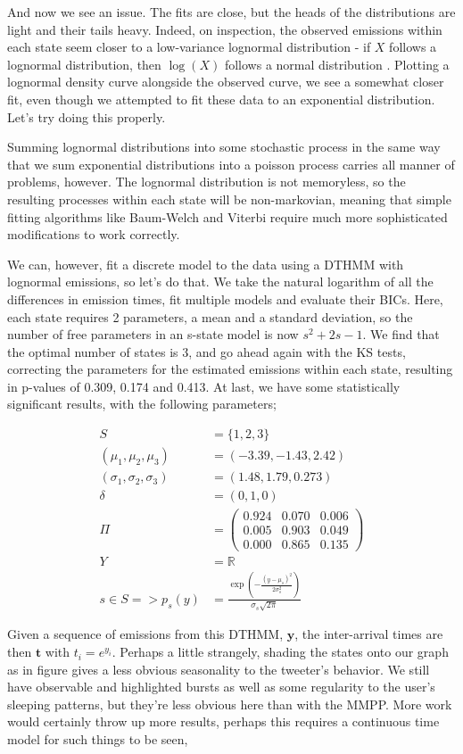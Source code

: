 
And now we see an issue. The fits are close, but the heads of the distributions are light and their tails heavy. Indeed, on inspection, the observed emissions within each state seem closer to a low-variance lognormal distribution - if $X$ follows a lognormal distribution, then $\log(X)$ follows a normal distribution %
. Plotting a lognormal density curve alongside the observed curve, we see a somewhat closer fit, even though we attempted to fit these data to an exponential distribution. Let's try doing this properly.

Summing lognormal distributions into some stochastic process in the same way that we sum exponential distributions into a poisson process carries all manner of problems, however. The lognormal distribution is not memoryless, so the resulting processes within each state will be non-markovian, meaning that simple fitting algorithms like Baum-Welch and Viterbi require much more sophisticated modifications to work correctly.

We can, however, fit a discrete model to the data using a DTHMM with lognormal emissions, so let's do that. We take the natural logarithm of all the differences in emission times, fit multiple models and evaluate their BICs. Here, each state requires 2 parameters, a mean and a standard deviation, so the number of free parameters in an s-state model is now $s^2+2s-1$. We find that the optimal number of states is 3, and go ahead again with the KS tests, correcting the parameters for the estimated emissions within each state, resulting in p-values of 0.309, 0.174 and 0.413. At last, we have some statistically significant results, with the following parameters;

\begin{align*}
S &= \{1,2,3\}\\
(\mu_1, \mu_2, \mu_3) &= (-3.39, -1.43, 2.42)\\
(\sigma_1, \sigma_2, \sigma_3) &= (1.48, 1.79, 0.273)\\
\delta &= (0,1,0)\\
\Pi &= 
\left(
	\begin{matrix}
     0.924 & 0.070 & 0.006 \\
     0.005 & 0.903 & 0.049 \\
     0.000 & 0.865 & 0.135
	\end{matrix}
\right)\\
Y &= \mathbb{R}\\
s \in S => p_s(y) &= \frac{\exp({-\frac{(y-\mu_s)^2}{2\sigma_s^2}})}{\sigma_s\sqrt{2\pi}}
\end{align*}

Given a sequence of emissions from this DTHMM, $\mathbf{y}$, the inter-arrival times are then $\mathbf{t}$ with $t_i = e^{y_i}$. Perhaps a little strangely, shading the states onto our graph as in figure %
gives a less obvious seasonality to the tweeter's behavior. We still have observable and highlighted bursts as well as some regularity to the user's sleeping patterns, but they're less obvious here than with the MMPP. More work would certainly throw up more results, perhaps this requires a continuous time model for such things to be seen,  

